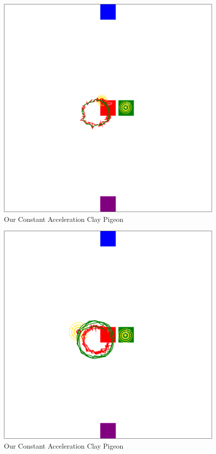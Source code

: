 \begin{figure}
   \begin{center}
   	\includegraphics[width=\textwidth]{kalman-path-ca1.png}
   \end{center}
   \caption{Our Constant Acceleration Clay Pigeon}
  \end{figure}
\begin{figure}
   \begin{center}
   	\includegraphics[width=\textwidth]{kalman-path-ca2.png}
   \end{center}
   \caption{Our Constant Acceleration Clay Pigeon}
  \end{figure}
